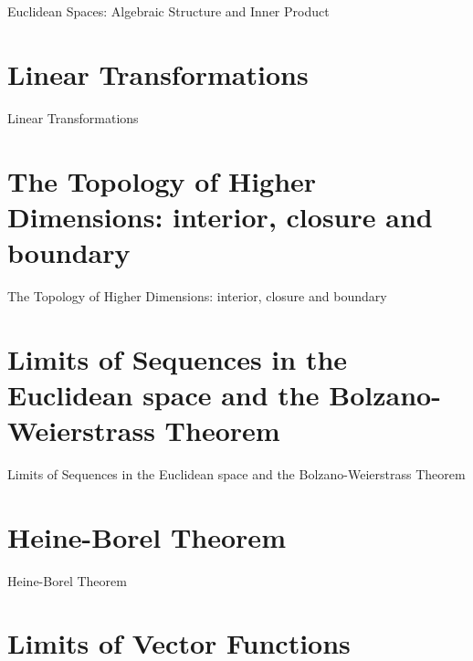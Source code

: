 Euclidean Spaces: Algebraic Structure and Inner Product

\section{Linear Transformations}
\label{sec:linear-transformations}

Linear Transformations

\section{The Topology of Higher Dimensions: interior, closure and boundary}
\label{sec:the-topology-of-higher-dimensions-interior-closure-and-boundary}

The Topology of Higher Dimensions: interior, closure and boundary

\section{Limits of Sequences in the Euclidean space and the Bolzano-Weierstrass Theorem}
\label{sec:limits-of-sequences-in-the-euclidean-space-and-the-bolzano-weierstrass-theorem}

Limits of Sequences in the Euclidean space and the Bolzano-Weierstrass Theorem

\section{Heine-Borel Theorem}
\label{sec:heine-borel-theorem}

Heine-Borel Theorem

\section{Limits of Vector Functions}
\label{sec:limits-of-vector-functions}

